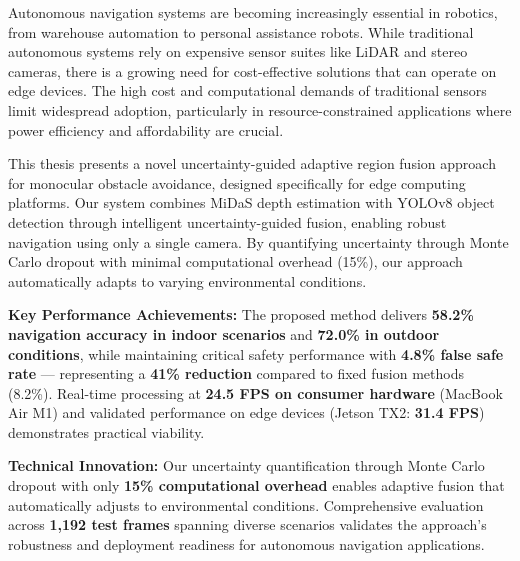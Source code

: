 \documentclass[12pt,oneside]{book}
\makeatletter
\renewcommand{\figurename}{FIGURE}
\renewcommand{\thefigure}{\Roman{figure}}
\renewcommand{\fnum@figure}{\figurename~\thefigure}
\makeatother
\begin{document}
Autonomous navigation systems are becoming increasingly essential in robotics, from warehouse automation to personal assistance robots. While traditional autonomous systems rely on expensive sensor suites like LiDAR and stereo cameras, there is a growing need for cost-effective solutions that can operate on edge devices. The high cost and computational demands of traditional sensors limit widespread adoption, particularly in resource-constrained applications where power efficiency and affordability are crucial.

This thesis presents a novel uncertainty-guided adaptive region fusion approach for monocular obstacle avoidance, designed specifically for edge computing platforms. Our system combines MiDaS depth estimation with YOLOv8 object detection through intelligent uncertainty-guided fusion, enabling robust navigation using only a single camera. By quantifying uncertainty through Monte Carlo dropout with minimal computational overhead (15\%), our approach automatically adapts to varying environmental conditions.

\vspace{1cm}\textbf{Key Performance Achievements:} The proposed method delivers \textbf{58.2\% navigation accuracy in indoor scenarios} and \textbf{72.0\% in outdoor conditions}, while maintaining critical safety performance with \textbf{4.8\% false safe rate} — representing a \textbf{41\% reduction} compared to fixed fusion methods (8.2\%). Real-time processing at \textbf{24.5 FPS on consumer hardware} (MacBook Air M1) and validated performance on edge devices (Jetson TX2: \textbf{31.4 FPS}) demonstrates practical viability.

\textbf{Technical Innovation:} Our uncertainty quantification through Monte Carlo dropout with only \textbf{15\% computational overhead} enables adaptive fusion that automatically adjusts to environmental conditions. Comprehensive evaluation across \textbf{1,192 test frames} spanning diverse scenarios validates the approach's robustness and deployment readiness for autonomous navigation applications.

\clearpage


\tableofcontents
\clearpage

\renewcommand{\listfigurename}{LIST OF FIGURES}
\renewcommand{\figurename}{FIGURE}
\renewcommand{\thefigure}{\Roman{figure}}
\makeatletter
\renewcommand{\fnum@figure}{\figurename~\thefigure}
\makeatother
\end{document}
